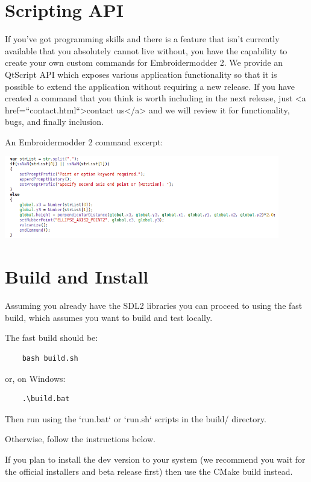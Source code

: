 \documentclass{report}
\begin{document}
\section{Scripting API}

If you've got programming skills and there is a feature that isn't currently available that you absolutely cannot live without, you have the capability to create your own custom commands for Embroidermodder 2. We provide an QtScript API which exposes various application functionality so that it is possible to extend the application without requiring a new release. If you have created a command that you think is worth including in the next release, just <a href=``contact.html``>contact us</a> and we will review it for functionality, bugs, and finally inclusion.

An Embroidermodder 2 command excerpt:

\includegraphics[width=0.9\textwidth]{images/features-scripting-1.png}

\section{Build and Install}

Assuming you already have the SDL2 libraries you can proceed to using the fast build, which assumes you want to build and test locally.

The fast build should be:

\begin{lstlisting}
    bash build.sh
\end{lstlisting}

or, on Windows:

\begin{lstlisting}
    .\build.bat
\end{lstlisting}

Then run using the `run.bat` or `run.sh` scripts in the build/ directory.

Otherwise, follow the instructions below.

If you plan to install the dev version to your system (we recommend you wait for the official installers and beta release first) then use the CMake build instead.
\end{document}
